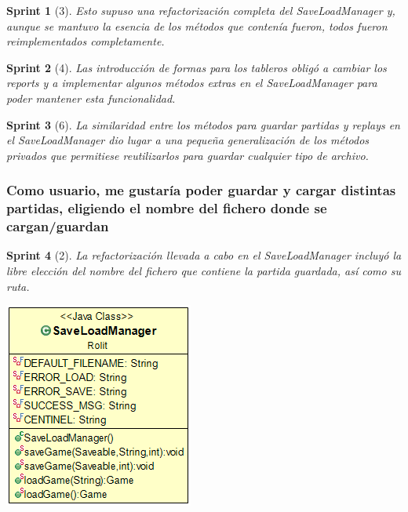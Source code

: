 \documentclass{article}
\theoremstyle{break}
\newtheorem*{sprint}{Sprint}
\begin{document}
\begin{sprint}[3]
Esto supuso una refactorización completa del \textit{SaveLoadManager} y, aunque se mantuvo la esencia de los métodos que contenía fueron, todos fueron reimplementados completamente.

\end{sprint}

\begin{sprint}[4]
Las introducción de formas para los tableros obligó a cambiar los reports y a implementar algunos métodos extras en el \textit{SaveLoadManager} para poder mantener esta funcionalidad.
\end{sprint}

\begin{sprint}[6]
La similaridad entre los métodos para guardar partidas y \textit{replays} en el \textit{SaveLoadManager} dio lugar a una pequeña generalización de los métodos privados que permitiese reutilizarlos para guardar cualquier tipo de archivo.
\end{sprint}

\subsubsection{Como usuario, me gustaría poder guardar y cargar distintas partidas, eligiendo el nombre del fichero donde se cargan/guardan}
\begin{sprint}[2]
La refactorización llevada a cabo en el SaveLoadManager incluyó la libre elección del nombre del fichero que contiene la partida guardada, así como su ruta.

\begin{center}
\centering
\includegraphics[scale=0.5]{save-load-manager-sprint2.png}
\end{center}

\end{sprint}
\end{document}
